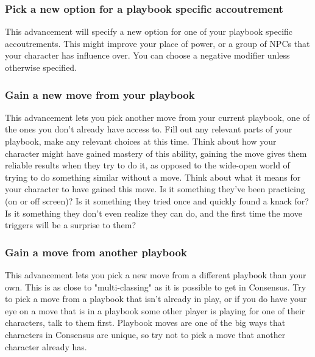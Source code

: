\documentclass[
  oneside,
  statementpaper,
  9pt]{memoir}
\begin{document}
\hypertarget{pick-a-new-option-for-a-playbook-specific-accoutrement}{%
\subsubsection{Pick a new option for a playbook specific
accoutrement}\label{pick-a-new-option-for-a-playbook-specific-accoutrement}}

\begin{Player}

This advancement will specify a new option for one of your playbook specific accoutrements. This might improve your place of power, or a group of NPCs that your character has influence over. You can choose a negative modifier unless otherwise specified.

\end{Player}

\hypertarget{gain-a-new-move-from-your-playbook}{%
\subsubsection{Gain a new move from your
playbook}\label{gain-a-new-move-from-your-playbook}}

\begin{Player}

This advancement lets you pick another move from your current playbook, one of the ones you don’t already have access to. Fill out any relevant parts of your playbook, make any relevant choices at this time. Think about how your character might have gained mastery of this ability, gaining the move gives them reliable results when they try to do it, as opposed to the wide-open world of trying to do something similar without a move. Think about what it means for your character to have gained this move. Is it something they’ve been practicing (on or off screen)? Is it something they tried once and quickly found a knack for? Is it something they don’t even realize they can do, and the first time the move triggers will be a surprise to them?

\end{Player}

\hypertarget{gain-a-move-from-another-playbook}{%
\subsubsection{Gain a move from another
playbook}\label{gain-a-move-from-another-playbook}}

\begin{Player}

This advancement lets you pick a new move from a different playbook than your own. This is as close to "multi-classing" as it is possible to get in Consensus. Try to pick a move from a playbook that isn’t already in play, or if you do have your eye on a move that is in a playbook some other player is playing for one of their characters, talk to them first. Playbook moves are one of the big ways that characters in Consensus are unique, so try not to pick a move that another character already has.

\end{Player}
\end{document}
